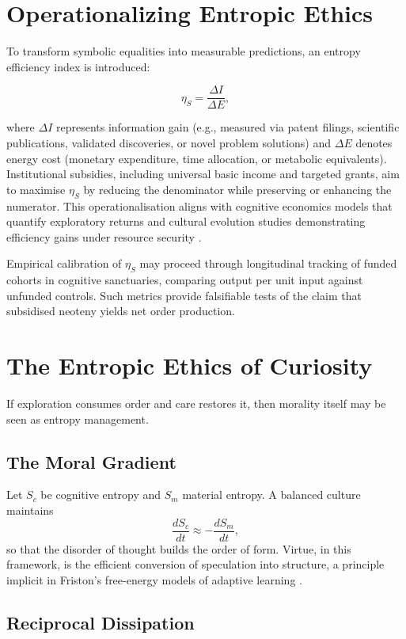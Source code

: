 \documentclass[12pt,a4paper]{article}
\begin{document}
\section{Operationalizing Entropic Ethics}

To transform symbolic equalities into measurable predictions, 
an entropy efficiency index is introduced:

\[
\eta_S = \frac{\Delta I}{\Delta E},
\]

where \(\Delta I\) represents information gain (e.g., measured via patent filings, 
scientific publications, validated discoveries, or novel problem solutions) 
and \(\Delta E\) denotes 
energy cost (monetary expenditure, time allocation, or metabolic equivalents). 
Institutional subsidies, including universal basic income and targeted grants, 
aim to maximise \(\eta_S\) by reducing the denominator while preserving or enhancing 
the numerator. This operationalisation aligns with cognitive economics models 
that quantify exploratory returns \citep{friston2023active} and cultural evolution 
studies demonstrating efficiency gains under resource security \citep{henrich2016cooperation}.

Empirical calibration of \(\eta_S\) may proceed through longitudinal tracking 
of funded cohorts in cognitive sanctuaries, comparing output per unit input 
against unfunded controls. Such metrics provide falsifiable tests of the claim 
that subsidised neoteny yields net order production.

\section{The Entropic Ethics of Curiosity}

If exploration consumes order and care restores it, 
then morality itself may be seen as entropy management.

\subsection{The Moral Gradient}

Let $S_c$ be cognitive entropy and $S_m$ material entropy.  
A balanced culture maintains
\[
\frac{dS_c}{dt} \approx -\frac{dS_m}{dt},
\]
so that the disorder of thought builds the order of form.
Virtue, in this framework, is the efficient conversion of speculation into structure,
a principle implicit in Friston’s free-energy models of adaptive learning 
\citep{friston2023active}.

\subsection{Reciprocal Dissipation}
\end{document}
